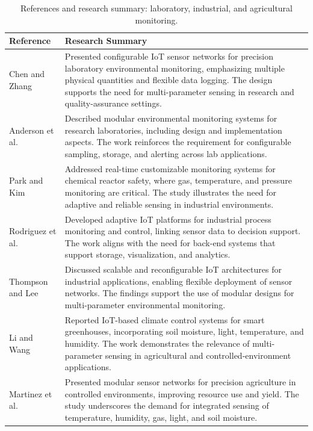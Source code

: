 \documentclass[journal,onecolumn]{IEEEtran}
\begin{document}
\begin{table}[h]
\centering
\caption{References and research summary: laboratory, industrial, and agricultural monitoring.}
\label{tab:lit-lab}
\small
\begin{tabular}{|p{}|p{}|}
\hline
\textbf{Reference} & \textbf{Research Summary} \\
\hline
Chen and Zhang \cite{labmonitoring2020} & Presented configurable IoT sensor networks for precision laboratory environmental monitoring, emphasizing multiple physical quantities and flexible data logging. The design supports the need for multi-parameter sensing in research and quality-assurance settings. \\
\hline
Anderson et al. \cite{precisionlab2021} & Described modular environmental monitoring systems for research laboratories, including design and implementation aspects. The work reinforces the requirement for configurable sampling, storage, and alerting across lab applications. \\
\hline
Park and Kim \cite{reactorsafety2022} & Addressed real-time customizable monitoring systems for chemical reactor safety, where gas, temperature, and pressure monitoring are critical. The study illustrates the need for adaptive and reliable sensing in industrial environments. \\
\hline
Rodriguez et al. \cite{processmonitoring2023} & Developed adaptive IoT platforms for industrial process monitoring and control, linking sensor data to decision support. The work aligns with the need for back-end systems that support storage, visualization, and analytics. \\
\hline
Thompson and Lee \cite{industrialiot2020} & Discussed scalable and reconfigurable IoT architectures for industrial applications, enabling flexible deployment of sensor networks. The findings support the use of modular designs for multi-parameter environmental monitoring. \\
\hline
Li and Wang \cite{greenhouseiot2019} & Reported IoT-based climate control systems for smart greenhouses, incorporating soil moisture, light, temperature, and humidity. The work demonstrates the relevance of multi-parameter sensing in agricultural and controlled-environment applications. \\
\hline
Martinez et al. \cite{smartgreenhouse2021} & Presented modular sensor networks for precision agriculture in controlled environments, improving resource use and yield. The study underscores the demand for integrated sensing of temperature, humidity, gas, light, and soil moisture. \\
\hline
\end{tabular}
\end{table}
\end{document}
